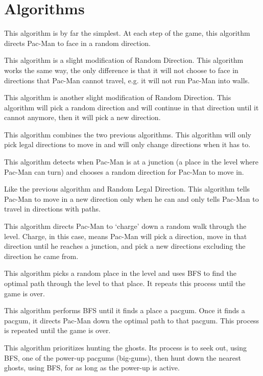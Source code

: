 \documentclass[12pt]{article}
\begin{document}
  \section*{Algorithms}
    \begin{description}
      \itemsep0pt
      \item[Random Direction] This algorithm is by far the simplest. At each step of the game, this algorithm directs Pac-Man to face in a random direction.
      \item[Random Legal Direction] This algorithm is a slight modification of Random Direction. This algorithm works the same way, the only difference is that it will not choose to face in directions that Pac-Man cannot travel, e.g. it will not run Pac-Man into walls.
      \item[Random Hold Direction] This algorithm is another slight modification of Random Direction. This algorithm will pick a random direction and will continue in that direction until it cannot anymore, then it will pick a new direction.
      \item[Random Legal Hold Direction] This algorithm combines the two previous algorithms. This algorithm will only pick legal directions to move in and will only change directions when it has to.
      \item[Random Turn] This algorithm detects when Pac-Man is at a junction (a place in the level where Pac-Man can turn) and chooses a random direction for Pac-Man to move in.
      \item[Random Legal Turn] Like the previous algorithm and Random Legal Direction. This algorithm tells Pac-Man to move in a new direction only when he can and only tells Pac-Man to travel in directions with paths.
      \item[Random Charge] This algorithm directs Pac-Man to `charge' down a random walk through the level. Charge, in this case, means Pac-Man will pick a direction, move in that direction until he reaches a junction, and pick a new directions excluding the direction he came from.
      \item[BFS Random] This algorithm picks a random place in the level and uses BFS to find the optimal path through the level to that place. It repeats this process until the game is over.
      \item[BFS Pacgum] This algorithm performs BFS until it finds a place a pacgum. Once it finds a pacgum, it directs Pac-Man down the optimal path to that pacgum. This process is repeated until the game is over.
      \item[BFS Aggress] This algorithm prioritizes hunting the ghosts. Its process is to seek out, using BFS, one of the power-up pacgums (big-gums), then hunt down the nearest ghosts, using BFS, for as long as the power-up is active.

\end{description}
\end{document}
